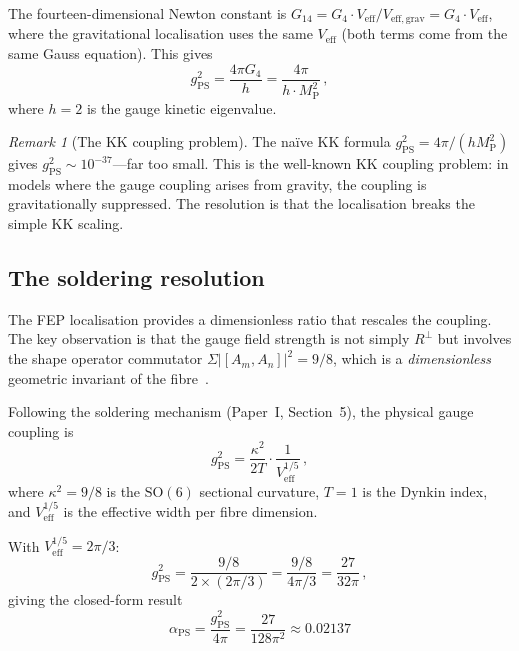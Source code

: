\documentclass[12pt, a4paper]{article}
\theoremstyle{definition}
\theoremstyle{remark}
\newtheorem{remark}[theorem]{Remark}
\newcommand{\SO}{\mathrm{SO}}
\newcommand{\Veff}{V_{\mathrm{eff}}}
\newcommand{\MP}{M_{\mathrm{P}}}
\newcommand{\gPS}{g_{\mathrm{PS}}}
\newcommand{\aPS}{\alpha_{\mathrm{PS}}}
\begin{document}
The fourteen-dimensional Newton constant is $G_{14} = G_4 \cdot \Veff / V_{\mathrm{eff,grav}} = G_4 \cdot \Veff$, where the gravitational localisation uses the same $\Veff$ (both terms come from the same Gauss equation).
This gives
\begin{equation}
\gPS^2 = \frac{4\pi G_4}{h} = \frac{4\pi}{h \cdot \MP^2}\,,
\end{equation}
where $h = 2$ is the gauge kinetic eigenvalue.

\begin{remark}[The KK coupling problem]
The na\"ive KK formula $\gPS^2 = 4\pi/(h \MP^2)$ gives $\gPS^2 \sim 10^{-37}$---far too small.
This is the well-known KK coupling problem: in models where the gauge coupling arises from gravity, the coupling is gravitationally suppressed.
The resolution is that the localisation breaks the simple KK scaling.
\end{remark}

\subsection{The soldering resolution}

The FEP localisation provides a dimensionless ratio that rescales the coupling.
The key observation is that the gauge field strength is not simply $R^\perp$ but involves the shape operator commutator $\Sigma |[A_m, A_n]|^2 = 9/8$, which is a \emph{dimensionless} geometric invariant of the fibre~\cite{Paper1}.

Following the soldering mechanism (Paper~I, Section~5), the physical gauge coupling is
\begin{equation}
\label{eq:soldering}
\gPS^2 = \frac{\kappa^2}{2T} \cdot \frac{1}{\Veff^{1/5}}\,,
\end{equation}
where $\kappa^2 = 9/8$ is the $\SO(6)$ sectional curvature, $T = 1$ is the Dynkin index, and $\Veff^{1/5}$ is the effective width per fibre dimension.

With $\Veff^{1/5} = 2\pi/3$:
\begin{equation}
\gPS^2 = \frac{9/8}{2 \times (2\pi/3)} = \frac{9/8}{4\pi/3} = \frac{27}{32\pi}\,,
\end{equation}
giving the closed-form result
\begin{equation}
\label{eq:alpha_FEP}
\boxed{\aPS = \frac{\gPS^2}{4\pi} = \frac{27}{128\pi^2} \approx 0.02137}
\end{equation}
\end{document}

